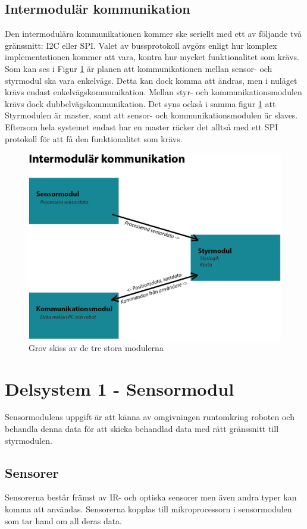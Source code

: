 \documentclass[11pt]{article}
\begin{document}
\begin{flushleft}
\subsection{Intermodulär kommunikation}
Den intermodulära kommunikationen kommer ske seriellt med ett av följande två gränssnitt: I2C eller SPI. 
Valet av bussprotokoll avgörs enligt hur komplex implementationen kommer att vara, kontra hur mycket funktionalitet som krävs.\\
\bigskip
Som kan ses i Figur \ref{fig:Intermodulär_Komm} är planen att kommunikationen mellan sensor- och styrmodul ska vara enkelvägs. Detta kan dock komma att ändras, men i nuläget krävs endast enkelvägskommunikation. Mellan styr- och kommunikationsmodulen krävs dock dubbelvägskommunikation. Det syns också i samma figur \ref{fig:Intermodulär_Komm} att Styrmodulen är master, samt att sensor- och kommunikationsmodulen är slaves. Eftersom hela systemet endast har en master räcker det alltså med ett SPI protokoll för att få den funktionalitet som krävs.




\begin{figure}[H]
\centering
\includegraphics[width=0.5\linewidth]{../Images/Intermodular_Komm}
\caption{Grov skiss av de tre stora modulerna}
\label{fig:Intermodulär_Komm}
\end{figure}



\section{Delsystem 1 - Sensormodul}
Sensormodulens uppgift är att känna av omgivningen runtomkring roboten och behandla denna data för att skicka behandlad data med rätt gränssnitt till styrmodulen.


\subsection{Sensorer}
Sensorerna består främst av IR- och optiska sensorer men även andra typer kan komma att användas. Sensorerna kopplas till mikroprocessorn i sensormodulen som tar hand om all deras data.


\end{flushleft}
\end{document}
